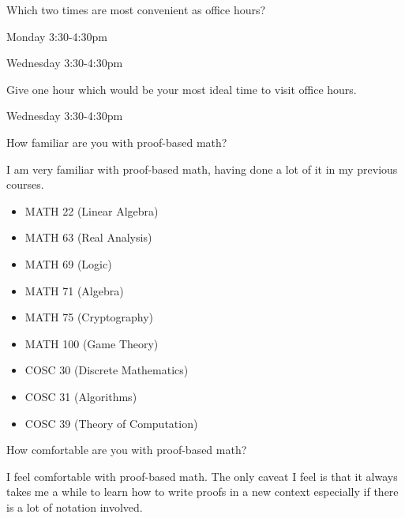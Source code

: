 \begin{problem}
  Which two times are most convenient as office hours?
  \begin{answer}
    \begin{enumarabic}
      \item Monday 3:30-4:30pm
      \item Wednesday 3:30-4:30pm
    \end{enumarabic}
  \end{answer}
\end{problem}


\begin{problem}
  Give one hour which would be your most ideal time to visit office hours.
  \begin{answer}
    Wednesday 3:30-4:30pm
  \end{answer}
\end{problem}

\begin{problem}
  How familiar are you with proof-based math?
  \begin{answer}
    I am very familiar with proof-based math, having done
    a lot of it in my previous courses.
    \begin{itemize}
      \item MATH 22 (Linear Algebra)
      \item MATH 63 (Real Analysis)
      \item MATH 69 (Logic)
      \item MATH 71 (Algebra)
      \item MATH 75 (Cryptography)
      \item MATH 100 (Game Theory)
      \item COSC 30 (Discrete Mathematics)
      \item COSC 31 (Algorithms)
      \item COSC 39 (Theory of Computation)
    \end{itemize}
  \end{answer}
\end{problem}

\newpage
\begin{problem}
  How comfortable are you with proof-based math?
  \begin{answer}
    I feel comfortable with proof-based math.
    The only caveat I feel is that it always takes me a while
    to learn how to write proofs in a new context
    especially if there is a lot of notation involved.
  \end{answer}
\end{problem}

